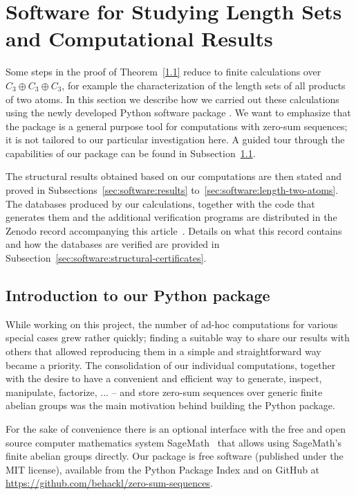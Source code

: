 \documentclass[a4paper, 10pt]{amsart}
\theoremstyle{plain}
\theoremstyle{definition}
\theoremstyle{definition}
\newcommand{\code}[1]{\texttt{\detokenize{#1}}}
\numberwithin{equation}{section}
\begin{document}
\smallskip
\section{Software for Studying Length Sets and Computational Results} \label{software}
\smallskip

Some steps in the proof of Theorem~\ref{1.1} reduce to finite calculations
over $C_3 \oplus C_3 \oplus C_3$, for example the characterization of
the length sets of all products of two atoms. In this section
we describe how we carried out these calculations using the newly developed
Python software package \code{zero-sum-sequences}.
We want to emphasize that the package is a general purpose tool
for computations with zero-sum sequences; it is not tailored to
our particular investigation here. A guided tour through the capabilities of our
package can be found in Subsection~\ref{sec:software:intro}.

The structural results obtained based on our computations are then
stated and proved in Subsections~\ref{sec:software:results}
to~\ref{sec:software:length-two-atoms}. The databases produced by our
calculations, together with the code that generates them and the
additional verification programs are distributed in
the Zenodo record accompanying this article~\cite{Ge-Ha-Zh27b}.
Details on what this record contains and how the databases are verified
are provided in Subsection~\ref{sec:software:structural-certificates}.

\subsection{Introduction to our Python package}\label{sec:software:intro}

While working on this project, the number of ad-hoc computations for various
special cases grew rather quickly; finding a suitable way to share our
results with others that allowed reproducing them in a simple and
straightforward way became a priority. The consolidation of our individual
computations, together with the desire to have a convenient and efficient
way to generate, inspect, manipulate, factorize, ... -- and store
zero-sum sequences over generic finite abelian groups was the main motivation
behind building the \code{zero-sum-sequences} Python package.

For the sake of convenience there is an optional
interface with the free and open source computer mathematics system
SageMath~\cite{sagemath:10.9} that allows using SageMath's finite abelian
groups directly.
Our package is free software (published
under the MIT license), available from the Python Package Index
and on GitHub at \url{https://github.com/behackl/zero-sum-sequences}.
\end{document}
